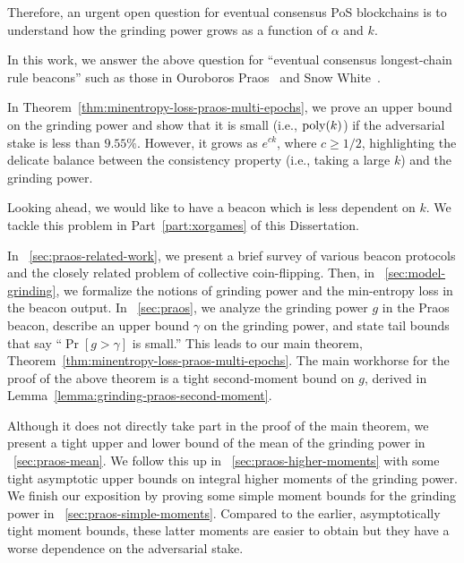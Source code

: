 Therefore, an urgent open question for eventual consensus PoS blockchains is to understand 
how the grinding power grows as a function of $\alpha$ and $k$. 


In this work, we answer the above question for ``eventual consensus longest-chain rule beacons'' such as those in 
Ouroboros Praos~\cite{Praos} and Snow White~\cite{SnowWhite}. 


In Theorem~\ref{thm:minentropy-loss-praos-multi-epochs}, 
we prove an upper bound on the grinding power 
and show that it is small (i.e., $\mathrm{poly}(k)$) if the adversarial stake is less than $9.55\%$.
However, it grows as $e^{ck}$, where $c \geq 1/2$, 
highlighting the delicate balance between the consistency property 
(i.e., taking a large $k$) 
and the grinding power.

Looking ahead, we would like to have a beacon which is less dependent on $k$. 
We tackle this problem in Part~\ref{part:xorgames} of this Dissertation.



In \Section~\ref{sec:praos-related-work}, 
we present a brief survey of various beacon protocols 
and the closely related problem of collective coin-flipping. 
Then, in \Section~\ref{sec:model-grinding}, 
we formalize the notions of grinding power and the min-entropy loss in the beacon output. 
In \Section~\ref{sec:praos}, 
we analyze the grinding power $g$ in the Praos beacon, 
describe an upper bound $\gamma$ on the grinding power, 
and state tail bounds that say ``$\Pr[g > \gamma]$ is small.'' 
This leads to our main theorem, Theorem~\ref{thm:minentropy-loss-praos-multi-epochs}.
The main workhorse for the proof of the above theorem is 
a tight second-moment bound on $g$, derived in Lemma~\ref{lemma:grinding-praos-second-moment}. 

Although it does not directly take part in the proof of the main theorem, 
we present a tight upper and lower bound of the mean of the grinding power 
in \Section~\ref{sec:praos-mean}. 
We follow this up in \Section~\ref{sec:praos-higher-moments} 
with some tight asymptotic upper bounds on 
integral higher moments of the grinding power. 
We finish our exposition by proving some simple moment bounds for the grinding power 
in \Section~\ref{sec:praos-simple-moments}. 
Compared to the earlier, asymptotically tight moment bounds, 
these latter moments are easier to obtain but 
they have a worse dependence on the adversarial stake.

